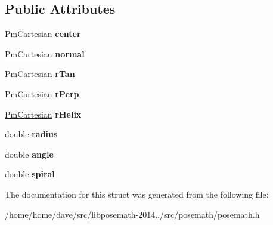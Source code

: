 \subsection*{Public Attributes}
\begin{DoxyCompactItemize}
\item 
\hypertarget{structPmCircle_abb8e717dcdf600e451cdb8153e37880c}{}\hyperlink{structPmCartesian}{Pm\+Cartesian} {\bfseries center}\label{structPmCircle_abb8e717dcdf600e451cdb8153e37880c}

\item 
\hypertarget{structPmCircle_abe570b56562fc0b35cd9d069b290970c}{}\hyperlink{structPmCartesian}{Pm\+Cartesian} {\bfseries normal}\label{structPmCircle_abe570b56562fc0b35cd9d069b290970c}

\item 
\hypertarget{structPmCircle_af65b788b063c25dae7d256577e1ed1b7}{}\hyperlink{structPmCartesian}{Pm\+Cartesian} {\bfseries r\+Tan}\label{structPmCircle_af65b788b063c25dae7d256577e1ed1b7}

\item 
\hypertarget{structPmCircle_a95a83221908ef57b4e5df2f52aa45636}{}\hyperlink{structPmCartesian}{Pm\+Cartesian} {\bfseries r\+Perp}\label{structPmCircle_a95a83221908ef57b4e5df2f52aa45636}

\item 
\hypertarget{structPmCircle_adbe1a652cb701779442fee961a4b092e}{}\hyperlink{structPmCartesian}{Pm\+Cartesian} {\bfseries r\+Helix}\label{structPmCircle_adbe1a652cb701779442fee961a4b092e}

\item 
\hypertarget{structPmCircle_a79a2ee314d4f0cb0283b69864ca58d88}{}double {\bfseries radius}\label{structPmCircle_a79a2ee314d4f0cb0283b69864ca58d88}

\item 
\hypertarget{structPmCircle_a45857969dbf5f2a349ccbeff556d1385}{}double {\bfseries angle}\label{structPmCircle_a45857969dbf5f2a349ccbeff556d1385}

\item 
\hypertarget{structPmCircle_aea2c69e2bc01682e81dfc1b8a4b5b56e}{}double {\bfseries spiral}\label{structPmCircle_aea2c69e2bc01682e81dfc1b8a4b5b56e}

\end{DoxyCompactItemize}


The documentation for this struct was generated from the following file\+:\begin{DoxyCompactItemize}
\item 
/home/home/dave/src/libposemath-\/2014../src/posemath/posemath.\+h\end{DoxyCompactItemize}
